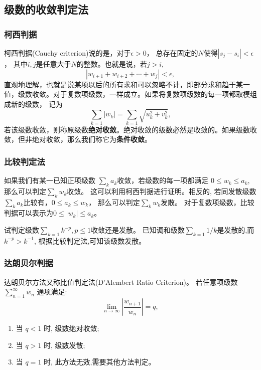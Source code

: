 \subsection{级数的收敛判定法}

\subsubsection{柯西判据}
柯西判据(Cauchy criterion)说的是，对于$\epsilon>0$， 总存在固定的$N$使得$|s_j - s_i|< \epsilon$， 其中$i,j$是任意大于$N$的整数。也就是说，若$j>i$,
\begin{equation}
    | w_{i+1} + w_{i+2} + \cdots + w_{j} | < \epsilon ,
\end{equation}
直观地理解，也就是说某项以后的所有求和可以忽略不计，即部分求和趋于某一值，级数收敛。对于复数项级数，一样成立。如果将复数项级数的每一项都取模组成新的级数，
记为
\begin{equation}
    \sum_{k=1} |w_k| = \sum_{k=1}\sqrt { u_k^2 + v_k^2},
\end{equation}
若该级数收敛，则称原级数\textbf{绝对收敛}。绝对收敛的级数必然是收敛的。如果级数收敛，但非绝对收敛，那么我们称它为\textbf{条件收敛}。
\subsubsection{比较判定法}
如果我们有某一已知正项级数 $\sum_k a_k$收敛，若级数的每一项都满足 $0 \leq w_k \leq a_k$, 那么可以判定$\sum_k w_k$收敛。
这可以利用柯西判据进行证明。相反的, 若同发散级数$\sum_{k} a_k$比较有，$0 \leq a_k  \leq w_k$， 那么可以判定$\sum_k w_k$发散。
对于复数项级数，比较判据可以表示为$0 \leq |w_k| \leq a_k$。

\begin{examplebox}{试判定级数$\sum_{k=1} k^{-p}, p\leq 1$收敛还是发散。}
    已知调和级数$\sum_{k=1}1/k$是发散的,而 $k^{-p} > k^{-1}$, 根据比较判定法,可知该级数发散。
\end{examplebox}

\subsubsection{达朗贝尔判据}
达朗贝尔方法又称比值判定法(D'Alembert Ratio Criterion)。
若任意项级数 $\sum_{n=1}^{\infty} w_n$ 通项满足:
$$
\lim _{n \to \infty}\left|\frac{w_{n+1}}{w_n}\right|=q ,
$$
\begin{enumerate}
    \item 当 $q<1$ 时, 级数绝对收敛;
    \item 当 $q>1$ 时, 级数发散;
    \item 当 $q=1$ 时, 此方法无效,需要其他方法判定。
\end{enumerate}

